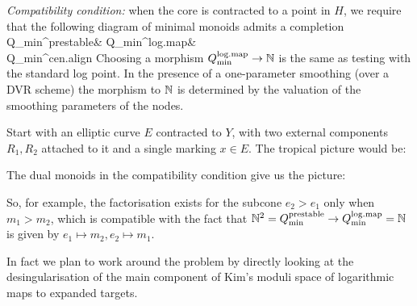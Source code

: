 \emph{Compatibility condition:} when the core is contracted to a point in $H$, we require that the following diagram of minimal monoids admits a completion
\bcd
Q_{\rm{min}}^{\rm{prestable}}\ar[r]\ar[d] & Q_{\rm{min}}^{\rm{log.map}}\ar[r,"\exists"] & \N \\
Q_{\rm{min}}^{\rm{cen.align}}
\ecd
Choosing a morphism $Q_{\rm{min}}^{\rm{log.map}}\to \N$ is the same as testing with the standard log point. In the presence of a one-parameter smoothing (over a DVR scheme) the morphism to $\N$ is determined by the valuation of the smoothing parameters of the nodes.
\begin{example}
 Start with an elliptic curve $E$ contracted to $Y$, with two external components $R_1, R_2$ attached to it and a single marking $x\in E$. The tropical picture would be:
\begin{center}
\end{center}
The dual monoids in the compatibility condition give us the picture:
\begin{center}
\end{center}
So, for example, the factorisation exists for the subcone $e_2>e_1$ only when $m_1>m_2$, which is compatible with the fact that $\mathbb N^2=Q_{\rm{min}}^{\rm{prestable}}\to Q_{\rm{min}}^{\rm{log.map}}=\mathbb N$ is given by
$e_1\mapsto m_2, e_2\mapsto m_1$.
\end{example}

In fact we plan to work around the problem by directly looking at the desingularisation of the main component of Kim's moduli space of logarithmic maps to expanded targets.


